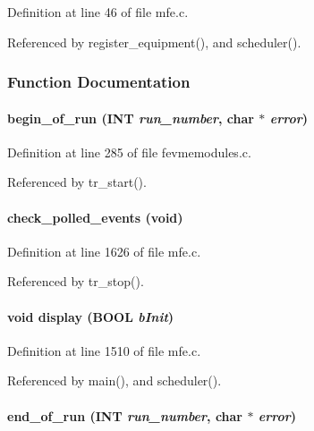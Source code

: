 Definition at line 46 of file mfe.c.

Referenced by register\_\-equipment(), and scheduler().

\subsubsection{Function Documentation}
\paragraph[{begin\_\-of\_\-run}]{ begin\_\-of\_\-run ({\bf INT} {\em run\_\-number}, \/  char $\ast$ {\em error})}\hfill\label{mfe_8c_ad8bfe703c49342b9f0275aba77dc7758}


Definition at line 285 of file fevmemodules.c.

Referenced by tr\_\-start().
\paragraph[{check\_\-polled\_\-events}]{ check\_\-polled\_\-events (void)}\hfill\label{mfe_8c_a6ed70b349943dd2724230ead1d85e4ec}


Definition at line 1626 of file mfe.c.

Referenced by tr\_\-stop().
\paragraph[{display}]{\setlength{\rightskip}{0pt plus 5cm}void display ({\bf BOOL} {\em bInit})}\hfill\label{mfe_8c_a4d77ab19483f67e8240c29a9ff9ca777}


Definition at line 1510 of file mfe.c.

Referenced by main(), and scheduler().
\paragraph[{end\_\-of\_\-run}]{ end\_\-of\_\-run ({\bf INT} {\em run\_\-number}, \/  char $\ast$ {\em error})}\hfill\label{mfe_8c_ae6d798649008b7523c77222bae2d4187}



